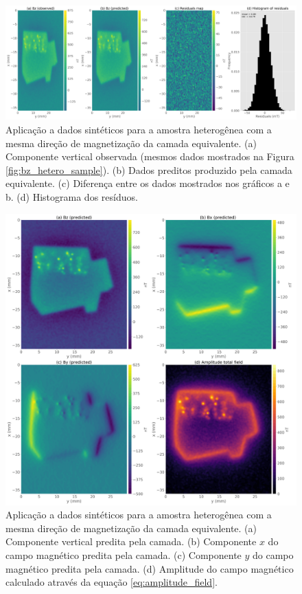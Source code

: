 \begin{figure}
	\centering
	\includegraphics[width=.9\textwidth]{Fig/mag_vec/simulacao_real_correto/results_data_fitting_Bz.png}
	\caption{Aplicação a dados sintéticos para a amostra heterogênea com a mesma direção de magnetização da camada equivalente. (a) Componente vertical observada (mesmos dados mostrados na Figura \ref{fig:bz_hetero_sample}). (b) Dados preditos produzido pela camada equivalente. (c) Diferença entre os dados mostrados nos gráficos a e b. (d) Histograma dos resíduos.}
	\label{fig:datafit_hetero_sample_samedir}
\end{figure}

\begin{figure}
	\centering
	\includegraphics[width=1.\textwidth]{Fig/mag_vec/simulacao_real_correto/field_components_eqlayer.png}
	\caption{Aplicação a dados sintéticos para a amostra heterogênea com a mesma direção de magnetização da camada equivalente. (a) Componente vertical predita pela camada. (b) Componente $x$ do campo magnético predita pela camada. (c) Componente $y$ do campo magnético predita pela camada. (d) Amplitude do campo magnético calculado através da equação \ref{eq:amplitude_field}.}
	\label{fig:components_hetero_sample_samedir}
\end{figure}

